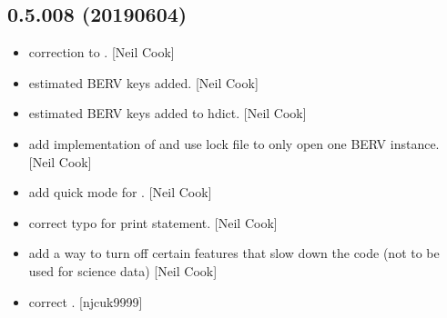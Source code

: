 \documentclass[a4paper,10pt,english]{report}
\begin{document}
\subsection{0.5.008 (2019\sphinxhyphen{}06\sphinxhyphen{}04)}
\label{\detokenize{misc/changelog:id147}}\begin{itemize}
\item {} 
 \sphinxhyphen{} correction to . {[}Neil Cook{]}

\item {} 
 \sphinxhyphen{} estimated BERV keys added. {[}Neil Cook{]}

\item {} 
 \sphinxhyphen{} estimated BERV keys added to hdict. {[}Neil
Cook{]}

\item {} 
 \sphinxhyphen{} add implementation of  and use lock file to
only open one BERV instance. {[}Neil Cook{]}

\item {} 
 \sphinxhyphen{} add quick mode for . {[}Neil Cook{]}

\item {} 
 \sphinxhyphen{} correct typo for print statement. {[}Neil Cook{]}

\item {} 
 \sphinxhyphen{} add a way to turn off certain features that
slow down the code (not to be used for science data) {[}Neil Cook{]}

\item {} 
 \sphinxhyphen{} correct . {[}njcuk9999{]}

\end{itemize}
\end{document}
